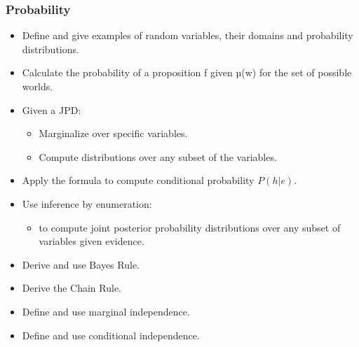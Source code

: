 \documentclass{article}
\begin{document}
\subsubsection*{Probability}

\begin{itemize}
    \item Define and give examples of random variables, their domains and probability distributions.
    \item Calculate the probability of a proposition f given µ(w) for the set of possible worlds.
    \item Given a JPD:
        \begin{itemize}
            \item Marginalize over specific variables.
            \item Compute distributions over any subset of the variables.
        \end{itemize}
    \item Apply the formula to compute conditional probability $P(h|e)$.
    \item Use inference by enumeration:
        \begin{itemize}
            \item to compute joint posterior probability distributions over any subset of variables given evidence.
        \end{itemize}
    \item Derive and use Bayes Rule.
    \item Derive the Chain Rule.
    \item Define and use marginal independence.
    \item Define and use conditional independence.
\end{itemize}
\end{document}

